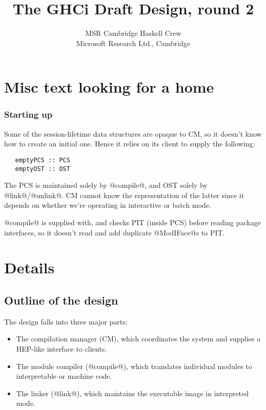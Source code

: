 \documentclass[11pt]{article}
\begin{document}
\title{The GHCi Draft Design, round 2}
\author{MSR Cambridge Haskell Crew \\
        Microsoft Research Ltd., Cambridge}

\maketitle


\section*{Misc text looking for a home}

\subsubsection*{Starting up}
Some of the session-lifetime data structures are opaque to CM, so
it doesn't know how to create an initial one.  Hence it relies on its
client to supply the following:
\begin{verbatim}
   emptyPCS :: PCS
   emptyOST :: OST
\end{verbatim}
The PCS is maintained solely by @compile@, and OST solely by
@link@/@unlink@.  CM cannot know the representation of the latter
since it depends on whether we're operating in interactive or batch
mode.


@compile@ is supplied with, and checks PIT (inside PCS) before
reading package interfaces, so it doesn't read and add duplicate
@ModIFace@s to PIT.


\section{Details}

\subsection{Outline of the design}
\label{sec:details-intro}

The design falls into three major parts:
\begin{itemize}
\item The compilation manager (CM), which coordinates the 
      system and supplies a HEP-like interface to clients.
\item The module compiler (@compile@), which translates individual
      modules to interpretable or machine code.
\item The linker (@link@),
      which maintains the executable image in interpreted mode.
\end{itemize}
\end{document}
